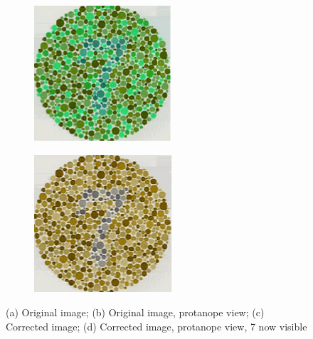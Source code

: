 \documentclass[10pt,twocolumn,letterpaper]{article}
\begin{document}
\begin{figure}[h]
\begin{subfigure}{0.23\textwidth}
    \caption{}
  \end{subfigure}
  \begin{subfigure}{0.23\textwidth}
    \includegraphics[width=\textwidth]{isihara3.png}
    \caption{}
  \end{subfigure}
  \begin{subfigure}{0.23\textwidth}
    \includegraphics[width=\textwidth]{isihara4.png}
    \caption{}
  \end{subfigure}
  \caption{(a) Original image; (b) Original image, protanope view; (c) Corrected image; (d) Corrected image, protanope view, 7 now visible}
  \label{fig:ishihara}
\end{figure}
\end{document}
